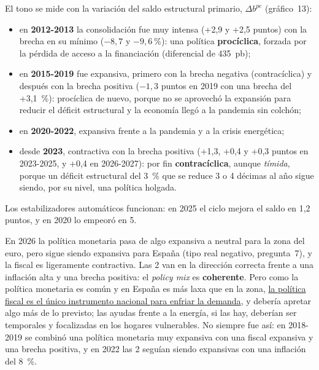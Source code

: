 \begin{examen}
El tono se mide con la variación del saldo estructural primario, $\Delta b^{pe}$ (gráfico~13):
\begin{itemize}
\item en \textbf{2012-2013} la consolidación fue muy intensa (+2,9 y +2,5 puntos) con la brecha en su mínimo ($-8{,}7$ y $-9{,}6~\%$): una política \textbf{procíclica}, forzada por la pérdida de acceso a la financiación (diferencial de 435~pb);
\item en \textbf{2015-2019} fue expansiva, primero con la brecha negativa (contracíclica) y después con la brecha positiva ($-1{,}3$ puntos en 2019 con una brecha del +3,1~\%): procíclica de nuevo, porque no se aprovechó la expansión para reducir el déficit estructural y la economía llegó a la pandemia sin colchón;
\item en \textbf{2020-2022}, expansiva frente a la pandemia y a la crisis energética;
\item desde \textbf{2023}, contractiva con la brecha positiva (+1,3, +0,4 y +0,3 puntos en 2023-2025, y +0,4 en 2026-2027): por fin \textbf{contracíclica}, aunque \emph{tímida}, porque un déficit estructural del 3~\% que se reduce 3 o 4 décimas al año sigue siendo, por su nivel, una política holgada.
\end{itemize}
Los estabilizadores automáticos funcionan: en 2025 el ciclo mejora el saldo en 1,2 puntos, y en 2020 lo empeoró en 5.

En 2026 la política monetaria pasa de algo expansiva a neutral para la zona del euro, pero sigue siendo expansiva para España (tipo real negativo, pregunta~7), y la fiscal es ligeramente contractiva. Las 2 van en la dirección correcta frente a una inflación alta y una brecha positiva: el \emph{policy mix} es \textbf{coherente}. Pero como la política monetaria es común y en España es más laxa que en la zona, \uline{la política fiscal es el único instrumento nacional para enfriar la demanda}, y debería apretar algo más de lo previsto; las ayudas frente a la energía, si las hay, deberían ser temporales y focalizadas en los hogares vulnerables. No siempre fue así: en 2018-2019 se combinó una política monetaria muy expansiva con una fiscal expansiva y una brecha positiva, y en 2022 las 2 seguían siendo expansivas con una inflación del 8~\%.


\end{examen}
